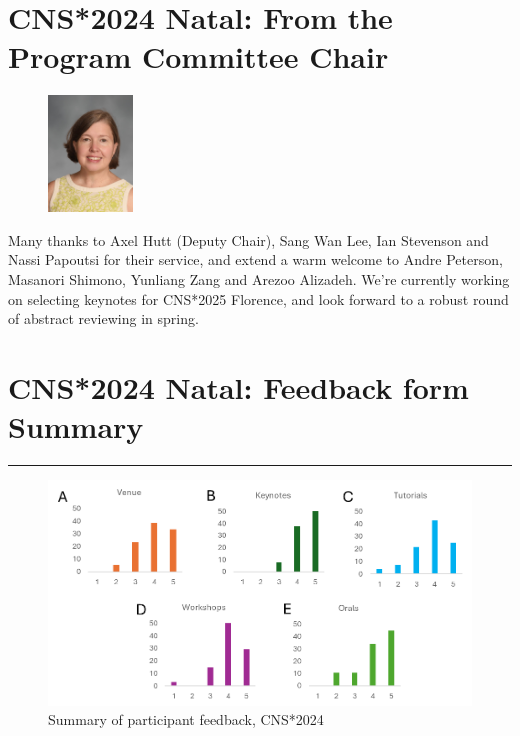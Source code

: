 \documentclass[11pt,a4paper,oneside]{article}
\begin{document}
\newpage
\section*{CNS*2024 Natal: From the Program Committee Chair}%
\begin{figure}
  \includegraphics[width=0.2\textwidth]{images/Haas}
\end{figure}

Many thanks to Axel Hutt (Deputy Chair), Sang Wan Lee, Ian Stevenson and Nassi Papoutsi for their service, and extend a warm welcome to Andre Peterson, Masanori Shimono, Yunliang Zang and Arezoo Alizadeh.
We're currently working on selecting keynotes for CNS*2025 Florence, and look forward to a robust round of abstract reviewing in spring.

\newpage


\newpage
\section*{CNS*2024 Natal: Feedback form Summary}%
\rule{\textwidth}{0.4pt}
\begin{figure}[h]
  \centering
  \includegraphics[width=\textwidth]{images/cns2024-feedback-form-summary}
  \caption{Summary of participant feedback, CNS*2024}%
  \label{fig:cns2024-summary}
\end{figure}
\end{document}
